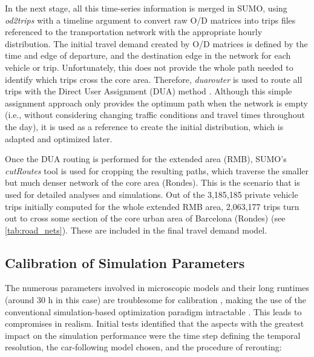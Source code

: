 In the next stage, all this time-series information is merged in SUMO, using \emph{od2trips} \citep{GermanAerospaceCenterDLRandothers2021b} with a timeline argument to convert raw O/D matrices into trips files referenced to the transportation network with the appropriate hourly distribution. The initial travel demand created by O/D matrices is defined by the time and edge of departure, and the destination edge in the network for each vehicle or trip. Unfortunately, this does not provide the whole path needed to identify which trips cross the core area. Therefore, \emph{duarouter} is used to route all trips with the Direct User Assignment (DUA) method \citep{GermanAerospaceCenterDLRandothers2021a}. Although this simple assignment approach only provides the optimum path when the network is empty (i.e., without considering changing traffic conditions and travel times throughout the day), it is used as a reference to create the initial distribution, which is adapted and optimized later.   

Once the DUA routing is performed for the extended area (RMB), SUMO’s \emph{cutRoutes} tool \citep{GermanAerospaceCenterDLRandothers2021} is used for cropping the resulting paths, which traverse the smaller but much denser network of the core area (Rondes). This is the scenario that is used for detailed analyses and simulations. Out of the 3,185,185 private vehicle trips initially computed for the whole extended RMB area, 2,063,177 trips turn out to cross some section of the core urban area of Barcelona (Rondes)  (see \autoref{tab:road_nets}). These are included in the final travel demand model.

\subsection{Calibration of Simulation Parameters}
\label{subsec:GR_2.4_cal_simu_params}

The numerous parameters involved in microscopic models and their long runtimes (around 30 h in this case) are troublesome for calibration \citep{Balakrishna2007}, making the use of the conventional simulation-based optimization \citep{Ciuffo2008} paradigm intractable \citep{alma990009089600205503}. This leads to compromises in realism. Initial tests identified that the aspects with the greatest impact on the simulation performance were the time step defining the temporal resolution, the car-following model chosen, and the procedure of rerouting:

